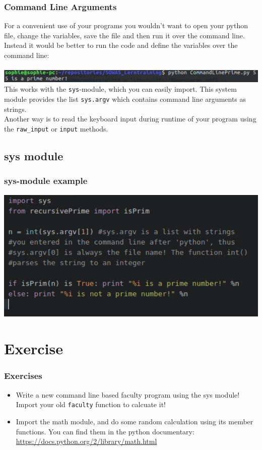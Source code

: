\documentclass{beamer}
\begin{document}
\begin{frame}
\frametitle{Command Line Arguments}
	For a convenient use of your programs you wouldn't want to open your python file, change the variables, save the file and then run it over the command line. Instead it would be better to run the code and define the variables over the command line: \\ $\,$ \\
	\includegraphics[width = 1\textwidth]{CommandLinePrime.pdf} \\
	This works with the \texttt{sys}-module, which you can easily import. This system module provides the list \texttt{sys.argv} which contains command line arguments as strings. \\ Another way is to read the keyboard input during runtime of your program using the \texttt{raw\_input} or \texttt{input} methods.
\end{frame}

\subsection{sys module}

\begin{frame}
\frametitle{sys-module example}
	\includegraphics[width = 1\textwidth]{SysExample.pdf} 
\end{frame}

\section{Exercise}

\begin{frame}
\frametitle{Exercises}
	\begin{itemize}
		\item Write a new command line based faculty program using the sys module! Import your old \texttt{faculty} function to calcuate it!
		\item Import the math module, and do some random calculation using its member functions. You can find them in the python documentary: \url{https://docs.python.org/2/library/math.html}
	\end{itemize}
\end{frame}
\end{document}
